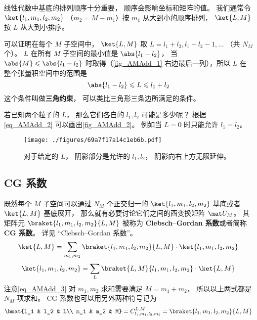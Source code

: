 线性代数中基底的排列顺序十分重要， 顺序会影响坐标和矩阵的值。 我们通常令 $\ket{l_1, m_1, l_2, m_2}$ （$m_2 = M - m_1$）按 $m_1$ 从大到小的顺序排列， $\ket{L, M}$ 按 $L$ 从大到小排序。

可以证明在每个 $M$ 子空间中， $\ket{L, M}$ 取 $L = l_1 + l_2, l_1 + l_2 - 1,\dots$ （共 $N_M$ 个）。 %
$L$ 在所有 $M$ 子空间的最小值是 $\abs{l_1 - l_2}$， 当 $\abs{M} \leqslant \abs{l_1 - l_2}$ 时取得（\autoref{fig_AMAdd_1} 右边最后一列），所以 $L$ 在整个张量积空间中的范围是
\begin{equation}\label{eq_AMAdd_2}
\abs{l_1 - l_2} \leqslant L \leqslant l_1 + l_2
\end{equation}
这个条件叫做\textbf{三角约束}， 可以类比三角形三条边所满足的条件。

若已知两个粒子的 $L$， 那么它们各自的 $l_1, l_2$ 可能是多少呢？ 根据\autoref{eq_AMAdd_2} 可以画出\autoref{fig_AMAdd_2}。 例如当 $L = 0$ 时只能允许 $l_1 = l_2$。
\begin{figure}[ht]
\centering
\texttt{[image: ./figures/69a7f17a14c1eb6b.pdf]}
\caption{对于给定的 $L$， 阴影部分是允许的 $l_1, l_2$， 阴影向右上方无限延伸。} \label{fig_AMAdd_2}
\end{figure}

\subsection{CG 系数}
既然每个 $M$ 子空间可以通过 $N_M$ 个正交归一的 $\ket{l_1, m_1, l_2, m_2}$ 基底或者 $\ket{L,M}$ 基底展开， 那么就有必要讨论它们之间的酉变换矩阵 $\mat U_M$。 其矩阵元 $\braket{l_1, m_1, l_2, m_2}{L, M}$ 被称为 \textbf{Clebsch–Gordan 系数}或者简称 \textbf{CG 系数}。 详见 “Clebsch–Gordan 系数”。
\begin{equation}\label{eq_AMAdd_3}
\ket{L, M} = \sum_{m_1, m_2}\braket{l_1, m_1, l_2, m_2}{L, M} \cdot \ket{l_1, m_1, l_2, m_2}
\end{equation}
\begin{equation}
\ket{l_1, m_1, l_2, m_2} = \sum_{L}\braket{L, M}{l_1, m_1, l_2, m_2} \cdot \ket{L, M}
\end{equation}
注意\autoref{eq_AMAdd_3} 对 $m_1,m_2$ 求和需要满足 $M = m_1 + m_2$， 所以以上两式都是 $N_M$ 项求和。 CG 系数也可以用另外两种符号记为
\begin{equation}
\bmat{l_1 & l_2 & L\\ m_1 & m_2 & M} = C_{l_1, m_1, l_2, m_2}^{L, M} = \braket{l_1, m_1, l_2, m_2}{L, M}
\end{equation}

